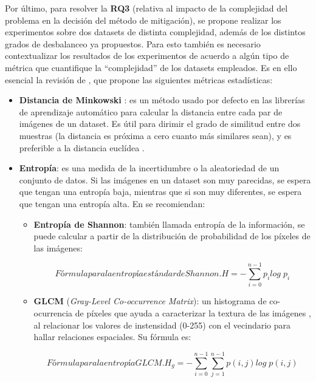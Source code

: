 Por último, para resolver la \textbf{RQ3} (relativa al impacto de la complejidad del problema en la decisión del método de mitigación), se propone realizar los experimentos sobre dos datasets de distinta complejidad, además de los distintos grados de desbalanceo ya propuestos. Para esto también es necesario contextualizar los resultados de los experimentos de acuerdo a algún tipo de métrica que cuantifique la ``complejidad'' de los datasets empleados. Es en ello esencial la revisión de \citet{rahane2020measures}, que propone las siguientes métricas estadísticas:

\begin{itemize}
    \fontsize{11pt}{12pt}\selectfont
    \item \textbf{Distancia de Minkowski} \cite{tensorflow2015-whitepaper}: es un método usado por defecto en las librerías de aprendizaje automático para calcular la distancia entre cada par de imágenes de un dataset. Es útil para dirimir el grado de similitud entre dos muestras (la distancia es próxima a cero cuanto más similares sean), y es preferible a la distancia euclídea \cite{rahane2020measures}.
    
    \item \textbf{Entropía}: es una medida de la incertidumbre o la aleatoriedad de un conjunto de datos. Si las imágenes en un dataset son muy parecidas, se espera que tengan una entropía baja, mientras que si son muy diferentes, se espera que tengan una entropía alta. En \citet{rahane2020measures} se recomiendan:

    \begin{itemize}
        \fontsize{11pt}{12pt}\selectfont
        \item \textbf{Entropía de Shannon}: también llamada entropía de la información, se puede calcular a partir de la distribución de probabilidad de los píxeles de las imágenes:

        \begin{equation}[EQ:SHANNON]{Fórmula para la entropía estándar de Shannon.}
            H = -\sum_{i=0}^{n-1}{p_i log \; p_i}
        \end{equation}

        \item \textbf{GLCM} (\textit{Gray-Level Co-occurrence Matrix}): un histograma de co-ocurrencia de píxeles que ayuda a caracterizar la textura de las imágenes \cite{rahane2020measures}, al relacionar los valores de instensidad (0-255) con el vecindario para hallar relaciones espaciales. Su fórmula es:

        \begin{equation}[EQ:GLCM]{Fórmula para la entropía GLCM.}
            H_g = -\sum_{i=0}^{n-1}{\sum_{j=1}^{n-1}{p(i,j) log \; p(i,j)}}
        \end{equation}
        
    \end{itemize}
\end{itemize}


